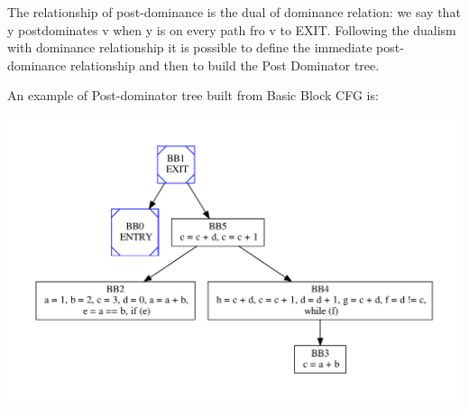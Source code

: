 The relationship of post-\/dominance is the dual of dominance relation\+: we say that y postdominates v when y is on every path fro v to E\+X\+IT. Following the dualism with dominance relationship it is possible to define the immediate post-\/dominance relationship and then to build the Post Dominator tree.

An example of Post-\/dominator tree built from Basic Block C\+FG is\+: 
\begin{DoxyImageNoCaption}
  \mbox{\includegraphics[width=\textwidth,height=\textheight/2,keepaspectratio=true]{dot_inline_dotgraph_11}}
\end{DoxyImageNoCaption}
 